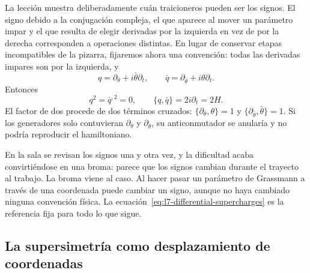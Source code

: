 La lección muestra deliberadamente cuán traicioneros pueden ser los signos. El signo debido a la conjugación compleja, el que aparece al mover un parámetro impar y el que resulta de elegir derivadas por la izquierda en vez de por la derecha corresponden a operaciones distintas. En lugar de conservar etapas incompatibles de la pizarra, fijaremos ahora una convención: todas las derivadas impares son por la izquierda, y
\begin{equation}
q=\partial_\theta+i\bar\theta\partial_t,
\qquad
\bar q=\partial_{\bar\theta}+i\theta\partial_t.
\label{eq:l7-differential-supercharges}
\end{equation}
Entonces
\begin{equation}
q^2=\bar q^{,2}=0,
\qquad
\{q,\bar q\}=2i\partial_t=2H.
\label{eq:l7-differential-algebra}
\end{equation}
El factor de dos procede de dos términos cruzados: \(\{\partial_\theta,\theta\}=1\) y \(\{\partial_{\bar\theta},\bar\theta\}=1\). Si los generadores solo contuvieran \(\partial_\theta\) y \(\partial_{\bar\theta}\), su anticonmutador se anularía y no podría reproducir el hamiltoniano.

\begin{classroomqa}
\end{classroomqa}

En la sala se revisan los signos una y otra vez, y la dificultad acaba convirtiéndose en una broma: parece que los signos cambian durante el trayecto al trabajo. La broma viene al caso. Al hacer pasar un parámetro de Grassmann a través de una coordenada puede cambiar un signo, aunque no haya cambiado ninguna convención física. La ecuación~\eqref{eq:l7-differential-supercharges} es la referencia fija para todo lo que sigue.

\subsection{La supersimetría como desplazamiento de coordenadas}

